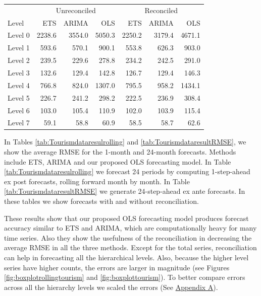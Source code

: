 \documentclass[11pt,a4paper,]{article}
\let\origtable\table
\let\endorigtable\endtable
\renewenvironment{table}[1][2] {
    \expandafter\origtable\expandafter[!htbp]
} {
    \endorigtable
}
\begin{document}
\begin{table}[t]

\caption{\label{tab:TourismdataresultRMSE}Mean(RMSE) for ETS, ARIMA and OLS with and without reconciliation - 24-step-ahead - Tourism dataset}
\centering
\begin{tabular}{lrrrrrr}
\toprule
\multicolumn{1}{c}{} & \multicolumn{3}{c}{Unreconciled} & \multicolumn{3}{c}{Reconciled} \\
\cmidrule(l{3pt}r{3pt}){2-4} \cmidrule(l{3pt}r{3pt}){5-7}
Level & ETS & ARIMA & OLS & ETS & ARIMA & OLS\\
\midrule
Level 0 & 2238.6 & 3554.0 & 5050.3 & 2250.2 & 3179.4 & 4671.1\\
Level 1 & 593.6 & 570.1 & 900.1 & 553.8 & 626.3 & 903.0\\
Level 2 & 239.5 & 229.6 & 278.8 & 234.2 & 242.5 & 291.0\\
Level 3 & 132.6 & 129.4 & 142.8 & 126.7 & 129.4 & 146.3\\
Level 4 & 766.8 & 824.0 & 1307.0 & 795.5 & 958.2 & 1434.1\\
Level 5 & 226.7 & 241.2 & 298.2 & 222.5 & 236.9 & 308.4\\
Level 6 & 103.0 & 105.4 & 110.9 & 102.0 & 103.9 & 115.4\\
Level 7 & 59.1 & 58.8 & 60.9 & 58.5 & 58.7 & 62.6\\
\bottomrule
\end{tabular}
\end{table}

In Tables \ref{tab:Tourismdataresulrolling} and \ref{tab:TourismdataresultRMSE}, we show the average RMSE for the 1-month and 24-month forecasts. Methods include ETS, ARIMA and our proposed OLS forecasting model. In Table \ref{tab:Tourismdataresulrolling} we forecast 24 periods by computing 1-step-ahead ex post forecasts, rolling forward month by month. In Table \ref{tab:TourismdataresultRMSE} we generate 24-step-ahead ex ante forecasts. In these tables we show forecasts with and without reconciliation.

These results show that our proposed OLS forecasting model produces forecast accuracy similar to ETS and ARIMA, which are computationally heavy for many time series. Also they show the usefulness of the reconciliation in decreasing the average RMSE in all the three methods. Except for the total series, reconciliation can help in forecasting all the hierarchical levels. Also, because the higher level series have higher counts, the errors are larger in magnitude (see Figures \ref{fig:boxplotrollingtourism} and \ref{fig:boxplottourism}). To better compare errors across all the hierarchy levels we scaled the errors (See \protect\hyperlink{appendixA}{Appendix A}).
\end{document}
